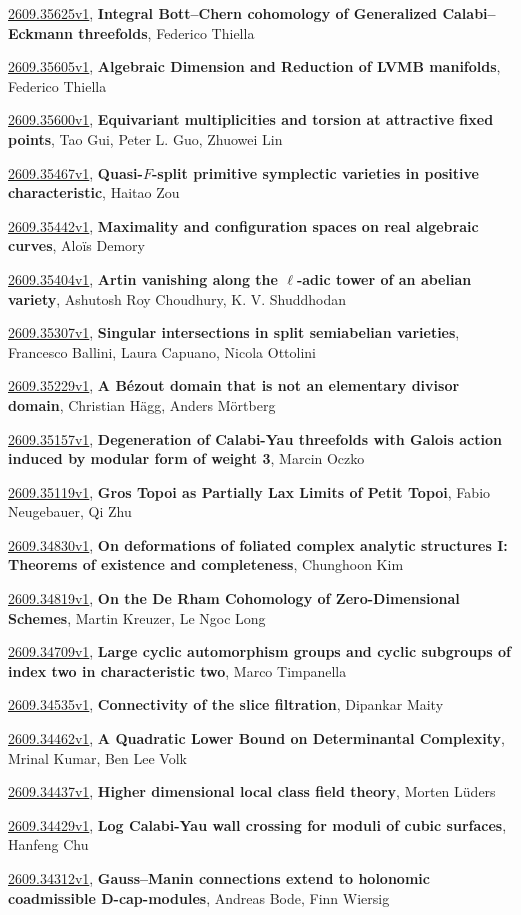 \documentclass[9pt, a4paper]{article}
\theoremstyle{plain}
\theoremstyle{definition}
\theoremstyle{remark}
\newcommand{\arxiv}[3]{\href{https://arxiv.org/abs/#1}{#1}, \textbf{\textcolor{arxivblue}{#2}}, #3}
\begin{document}
\arxiv{2609.35625v1}{Integral Bott--Chern cohomology of Generalized Calabi--Eckmann threefolds}{Federico Thiella}

\arxiv{2609.35605v1}{Algebraic Dimension and Reduction of LVMB manifolds}{Federico Thiella}

\arxiv{2609.35600v1}{Equivariant multiplicities and torsion at attractive fixed points}{Tao Gui, Peter L. Guo, Zhuowei Lin}

\arxiv{2609.35467v1}{Quasi-$F$-split primitive symplectic varieties in positive characteristic}{Haitao Zou}

\arxiv{2609.35442v1}{Maximality and configuration spaces on real algebraic curves}{Aloïs Demory}

\arxiv{2609.35404v1}{Artin vanishing along the $\ell$-adic tower of an abelian variety}{Ashutosh Roy Choudhury, K. V. Shuddhodan}

\arxiv{2609.35307v1}{Singular intersections in split semiabelian varieties}{Francesco Ballini, Laura Capuano, Nicola Ottolini}

\arxiv{2609.35229v1}{A Bézout domain that is not an elementary divisor domain}{Christian Hägg, Anders Mörtberg}

\arxiv{2609.35157v1}{Degeneration of Calabi-Yau threefolds with Galois action induced by modular form of weight 3}{Marcin Oczko}

\arxiv{2609.35119v1}{Gros Topoi as Partially Lax Limits of Petit Topoi}{Fabio Neugebauer, Qi Zhu}

\arxiv{2609.34830v1}{On deformations of foliated complex analytic structures I: Theorems of existence and completeness}{Chunghoon Kim}

\arxiv{2609.34819v1}{On the De Rham Cohomology of Zero-Dimensional Schemes}{Martin Kreuzer, Le Ngoc Long}

\arxiv{2609.34709v1}{Large cyclic automorphism groups and cyclic subgroups of index two in characteristic two}{Marco Timpanella}

\arxiv{2609.34535v1}{Connectivity of the slice filtration}{Dipankar Maity}

\arxiv{2609.34462v1}{A Quadratic Lower Bound on Determinantal Complexity}{Mrinal Kumar, Ben Lee Volk}

\arxiv{2609.34437v1}{Higher dimensional local class field theory}{Morten Lüders}

\arxiv{2609.34429v1}{Log Calabi-Yau wall crossing for moduli of cubic surfaces}{Hanfeng Chu}

\arxiv{2609.34312v1}{Gauss--Manin connections extend to holonomic coadmissible D-cap-modules}{Andreas Bode, Finn Wiersig}
\end{document}
